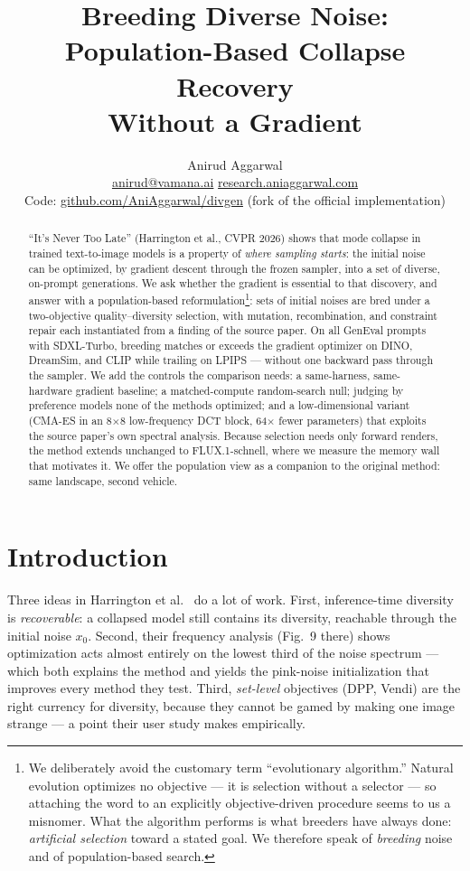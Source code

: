 \documentclass[10pt,twocolumn,letterpaper]{article}
\title{\LARGE \bf Breeding Diverse Noise: Population-Based Collapse Recovery\\
Without a Gradient}
\author{Anirud Aggarwal\\
\small \href{mailto:anirud@vamana.ai}{anirud@vamana.ai} \;\;
\href{https://research.aniaggarwal.com}{research.aniaggarwal.com}\\
\small Code: \href{https://github.com/AniAggarwal/divgen}{github.com/AniAggarwal/divgen} (fork of the official implementation)}
\date{}
\begin{document}
\maketitle

\begin{abstract}
``It's Never Too Late'' (Harrington et al., CVPR 2026) shows that mode collapse
in trained text-to-image models is a property of \emph{where sampling starts}:
the initial noise can be optimized, by gradient descent through the frozen
sampler, into a set of diverse, on-prompt generations. We ask whether the
gradient is essential to that discovery, and answer with a
population-based reformulation\footnote{We deliberately avoid the customary
term ``evolutionary algorithm.'' Natural evolution optimizes no objective ---
it is selection without a selector --- so attaching the word to an explicitly
objective-driven procedure seems to us a misnomer. What the algorithm performs
is what breeders have always done: \emph{artificial selection} toward a stated
goal. We therefore speak of \emph{breeding} noise and of population-based
search.}: sets of initial noises are bred under a two-objective
quality--diversity selection, with mutation, recombination, and constraint
repair each instantiated from a finding of the source paper. On all
\nbNumPrompts{} GenEval prompts with SDXL-Turbo, breeding matches or exceeds
the gradient optimizer on DINO, DreamSim, and CLIP while trailing on LPIPS ---
without one backward pass through the sampler. We add the controls the
comparison needs: a same-harness, same-hardware gradient baseline; a
matched-compute random-search null; judging by preference models none of the
methods optimized; and a low-dimensional variant (CMA-ES in an 8$\times$8
low-frequency DCT block, 64$\times$ fewer parameters) that exploits the source
paper's own spectral analysis. Because selection needs only forward renders,
the method extends unchanged to FLUX.1-schnell, where we measure the memory
wall that motivates it. We offer the population view as a companion to the
original method: same landscape, second vehicle.
\end{abstract}

\section{Introduction}

Three ideas in Harrington et al.~\cite{harrington2026never} do a lot of work.
First, inference-time diversity is \emph{recoverable}: a collapsed model still
contains its diversity, reachable through the initial noise $x_0$. Second,
their frequency analysis (Fig.~9 there) shows optimization acts almost
entirely on the lowest third of the noise spectrum --- which both explains the
method and yields the pink-noise initialization that improves every method
they test. Third, \emph{set-level} objectives (DPP, Vendi) are the right
currency for diversity, because they cannot be gamed by making one image
strange --- a point their user study makes empirically.
\end{document}
